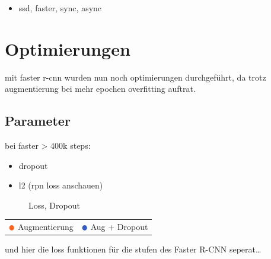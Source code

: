 \begin{itemize}
  \item ssd, faster, sync, async
\end{itemize}


\section{Optimierungen}
mit faster r-cnn wurden nun noch optimierungen durchgeführt, da 
trotz augmentierung bei mehr epochen overfitting auftrat.

\subsection{Parameter}
bei faster > 400k steps:
\begin{itemize}
  \item dropout
  \item l2 (rpn loss anschauen)
\end{itemize}

\begin{figure}[htb]
  \centering
  \label{plot:dropout}
  \def\svgwidth{0.6\textwidth}
  
  \caption{Loss, Dropout}
\end{figure}

\begin{table}[htb]
  \centering
  \begin{tabular}{m{}l}
      $\color[RGB]{255,100,30}\medbullet$  Augmentierung & $\color[RGB]{50,90,200}\medbullet$  Aug + Dropout
  \end{tabular}    
\end{table}

und hier die loss funktionen für die stufen des Faster R-CNN 
seperat\dots

  \begin{minipage}{0.5\textwidth}
    \centering
    \label{plot:dropout_obj}
    \def\svgwidth{0.9\textwidth}
    
  \end{minipage}
  \begin{minipage}{0.5\textwidth}
    \centering
    \label{plot:dropout_class}
    \def\svgwidth{0.9\textwidth}
    
  \end{minipage}


